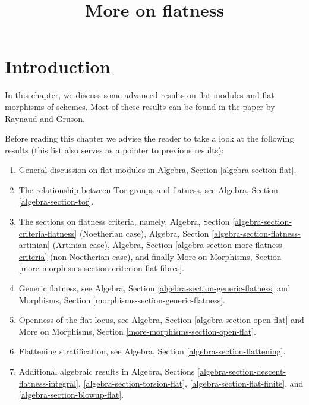 

%


\title{More on flatness}

\maketitle

\label{section-phantom}

\tableofcontents



\section{Introduction}
\label{section-introduction}

\noindent
In this chapter, we discuss some advanced results on flat modules and
flat morphisms of schemes. Most of these results can be
found in the paper \cite{GruRay} by Raynaud and Gruson.

\medskip\noindent
Before reading this chapter we advise the reader to take a look
at the following results (this list also serves as a pointer to
previous results):
\begin{enumerate}
\item General discussion on flat modules in
Algebra, Section \ref{algebra-section-flat}.
\item The relationship between $\text{Tor}$-groups and flatness, see
Algebra, Section \ref{algebra-section-tor}.
\item The sections on flatness criteria, namely,
Algebra, Section \ref{algebra-section-criteria-flatness}
(Noetherian case),
Algebra, Section \ref{algebra-section-flatness-artinian}
(Artinian case),
Algebra, Section \ref{algebra-section-more-flatness-criteria}
(non-Noetherian case), and finally
More on Morphisms, Section \ref{more-morphisms-section-criterion-flat-fibres}.
\item Generic flatness, see
Algebra, Section \ref{algebra-section-generic-flatness}
and
Morphisms, Section \ref{morphisms-section-generic-flatness}.
\item Openness of the flat locus, see
Algebra, Section \ref{algebra-section-open-flat}
and
More on Morphisms, Section \ref{more-morphisms-section-open-flat}.
\item Flattening stratification, see
Algebra, Section \ref{algebra-section-flattening}.
\item Additional algebraic results in
Algebra, Sections \ref{algebra-section-descent-flatness-integral},
\ref{algebra-section-torsion-flat},
\ref{algebra-section-flat-finite}, and
\ref{algebra-section-blowup-flat}.
\end{enumerate}




